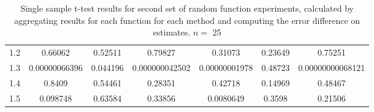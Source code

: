 \documentclass[a4paper,11pt,twoside]{article}
\begin{document}
\begin{appendices}
\begin{table}[htb]
\begin{center}
{\begin{tabular}{r|cccccc}
  1.2  &              0.66062  &   0.52511  &               0.79827  &              0.31073  &   0.23649  &                 0.75251  \\
  1.3  &  \num{0.00000066396}  &  0.044196  &  \num{0.000000042502}  &  \num{0.00000001978}  &   0.48723  &  \num{0.00000000068121}  \\
  1.4  &               0.8409  &   0.54461  &               0.28351  &              0.42718  &   0.14969  &                 0.48467  \\
  1.5  &             0.098748  &   0.63584  &               0.33856  &            0.0080649  &    0.3598  &                 0.21506  \\
  \end{tabular}
  }
  \end{center}
  \caption{Single sample t-test results for second set of random function
  experiments, calculated by aggregating results for each function for each
  method and computing the error difference on estimates. $n=$ 25} \end{table}

\end{appendices}
\end{document}
